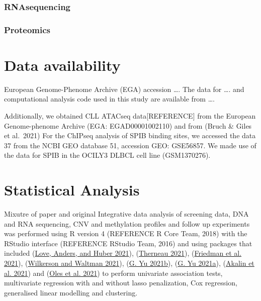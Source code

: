 \documentclass[11pt, a4paper, twosided]{book}
\begin{document}
\hypertarget{rnasequencing}{%
\subsubsection{RNAsequencing}\label{rnasequencing}}

\hypertarget{proteomics}{%
\subsubsection{Proteomics}\label{proteomics}}

\hypertarget{data-availability}{%
\section{Data availability}\label{data-availability}}

European Genome-Phenome Archive (EGA) accession \ldots. The data for \ldots. and computational analysis code used in this study are available from \ldots.

Additionally, we obtained CLL ATACseq data{[}REFERENCE{]} from the European Genome-phenome Archive (EGA: EGAD00001002110) and from (Bruch \& Giles et al.~2021)
For the ChIPseq analysis of SPIB binding sites, we accessed the data 37 from the NCBI GEO database 51, accession GEO: GSE56857. We made use of the data for SPIB in the OCILY3 DLBCL cell line (GSM1370276).

\hypertarget{statistical-analysis}{%
\section{Statistical Analysis}\label{statistical-analysis}}

Mixutre of paper and original
Integrative data analysis of screening data, DNA and RNA sequencing, CNV and methylation profiles and follow up experiments was performed using R version 4 (REFERENCE R Core Team, 2018) with the RStudio interface (REFERENCE RStudio Team, 2016) and using packages that included (\protect\hyperlink{ref-R-DESeq2}{Love, Anders, and Huber 2021}), (\protect\hyperlink{ref-R-survival}{Therneau 2021}), (\protect\hyperlink{ref-R-glmnet}{Friedman et al. 2021}), (\protect\hyperlink{ref-R-ConsensusClusterPlus}{Wilkerson and Waltman 2021}), (\protect\hyperlink{ref-R-clusterProfiler}{G. Yu 2021b}), (\protect\hyperlink{ref-R-ChIPseeker}{G. Yu 2021a}), (\protect\hyperlink{ref-R-genomation}{Akalin et al. 2021}) and (\protect\hyperlink{ref-R-BloodCancerMultiOmics2017}{Oles et al. 2021}) to perform univariate association tests, multivariate regression with and without lasso penalization, Cox regression, generalised linear modelling and clustering.
\end{document}
